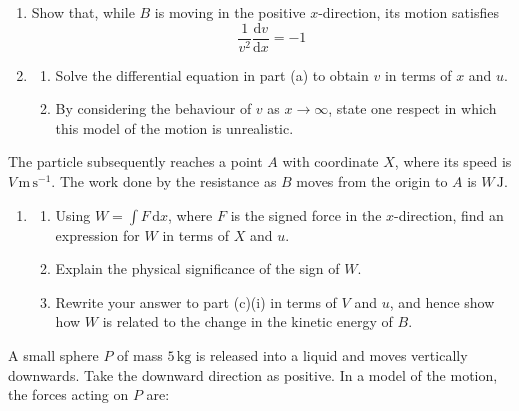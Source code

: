\documentclass[leqno]{article}
\begin{document}
\begin{enumerate}[
  label=\textbf{\arabic*.},
  leftmargin=*,
  topsep=0pt,
  partopsep=0pt,
  parsep=0pt
]
\begin{enumerate}[label=\textbf{(\alph*)}]
  \item Show that, while $B$ is moving in the positive $x$-direction, its motion satisfies
  \[
  \frac{1}{v^2}\frac{\mathrm{d}v}{\mathrm{d}x}=-1
  \]
  \item
  \begin{enumerate}[label=(\roman*)]
    \item Solve the differential equation in part (a) to obtain $v$ in terms of $x$ and $u$.  \\
    \item By considering the behaviour of $v$ as $x\to\infty$, state one respect in which this model of the motion is unrealistic.  \\
  \end{enumerate}
\end{enumerate}
The particle subsequently reaches a point $A$ with coordinate $X$, where its speed is $V\,\mathrm{m\,s^{-1}}$. The work done by the resistance as $B$ moves from the origin to $A$ is $W\,\mathrm{J}$. \\
\begin{enumerate}[label=\textbf{(\alph*)}, resume]
  \item
  \begin{enumerate}[label=(\roman*)]
    \item Using $W=\int F\,\mathrm{d}x$, where $F$ is the signed force in the $x$-direction, find an expression for $W$ in terms of $X$ and $u$.  \\
    \item Explain the physical significance of the sign of $W$.  \\
    \item Rewrite your answer to part (c)(i) in terms of $V$ and $u$, and hence show how $W$ is related to the change in the kinetic energy of $B$.  \\
  \end{enumerate}
\end{enumerate}

\newpage

\questionitem

A small sphere $P$ of mass $5\,\mathrm{kg}$ is released into a liquid and moves vertically downwards. Take the downward direction as positive. In a model of the motion, the forces acting on $P$ are: \\


\end{enumerate}
\end{document}
